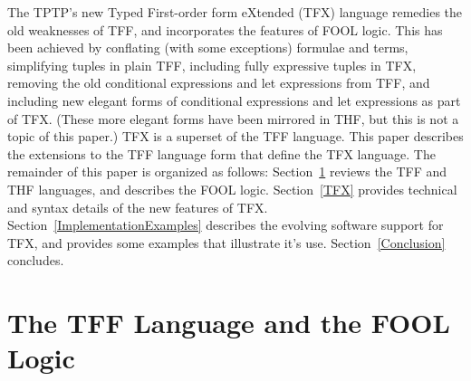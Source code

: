 \documentclass{easychair}
\begin{document}
The TPTP's new Typed First-order form eXtended (TFX) language remedies the
old weaknesses of TFF, and incorporates the features of FOOL logic.
This has been achieved by conflating (with some exceptions) formulae and 
terms, simplifying tuples in plain TFF, including fully expressive tuples in 
TFX, removing the old conditional expressions and let expressions from 
TFF, and including new elegant forms of conditional expressions and let 
expressions as part of TFX. 
(These more elegant forms have been mirrored in THF, but this is not a topic of
this paper.)
TFX is a superset of the TFF language. 
This paper describes the extensions to the TFF language form that define the 
TFX language.
The remainder of this paper is organized as follows:
Section~\ref{TPTPFOOL} reviews the TFF and THF languages, and
describes the FOOL logic.
Section~\ref{TFX} provides technical and syntax details of the new features 
of TFX.
Section~\ref{ImplementationExamples} describes the evolving software 
support for TFX, and provides some examples that illustrate it's use.
Section~\ref{Conclusion} concludes.

\section{The TFF Language and the FOOL Logic}
\label{TPTPFOOL}
\end{document}
